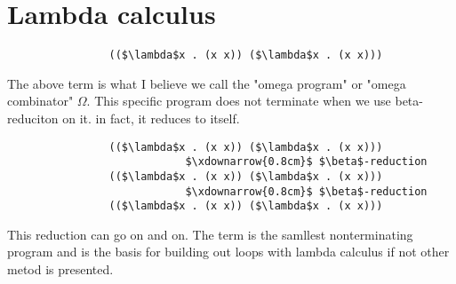 \section{Lambda calculus}
\begin{lstlisting}
                (($\lambda$x . (x x)) ($\lambda$x . (x x)))
\end{lstlisting}

The above term is what I believe we call the "omega program" or "omega combinator" $\Omega$.
This specific program does not terminate when we use beta-reduciton on it.
in fact, it reduces to itself.

\begin{lstlisting}
                (($\lambda$x . (x x)) ($\lambda$x . (x x)))
                            $\xdownarrow{0.8cm}$ $\beta$-reduction 
                (($\lambda$x . (x x)) ($\lambda$x . (x x)))
                            $\xdownarrow{0.8cm}$ $\beta$-reduction 
                (($\lambda$x . (x x)) ($\lambda$x . (x x)))
\end{lstlisting}

This reduction can go on and on. The term is the samllest nonterminating program
and is the basis for building out loops with lambda calculus if not other metod
is presented.